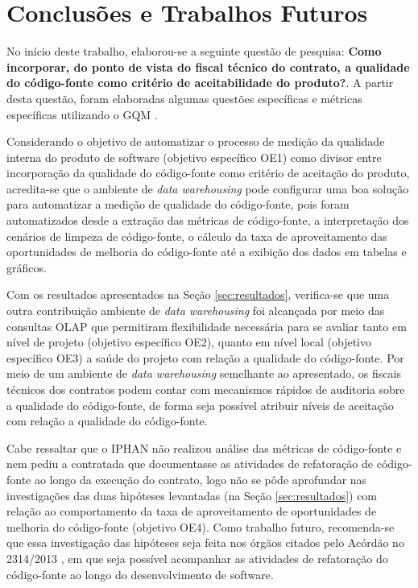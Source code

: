 \section{Conclusões e Trabalhos Futuros}

No início deste trabalho, elaborou-se a seguinte questão de pesquisa: \textbf{Como incorporar, do ponto de vista do fiscal técnico do contrato, a qualidade do código-fonte como critério de aceitabilidade do produto?}. A partir desta questão, foram elaboradas algumas questões específicas e métricas específicas utilizando o GQM \cite{Basili96b}.

Considerando o objetivo de automatizar o processo de medição da qualidade interna do produto de software (objetivo específico OE1) como divisor entre incorporação da qualidade do código-fonte como critério de aceitação do produto, acredita-se que o ambiente de \textit{data warehousing} pode configurar uma boa solução para automatizar a medição de qualidade do código-fonte, pois foram automatizados desde a extração das métricas de código-fonte, a interpretação dos cenários de limpeza de código-fonte, o cálculo da taxa de aproveitamento das oportunidades de melhoria do código-fonte até a exibição dos dados em tabelas e gráficos.

Com os resultados apresentados na Seção \ref{sec:resultados}, verifica-se que uma outra contribuição ambiente de \textit{data warehousing} foi alcançada por meio das consultas OLAP que permitiram flexibilidade necessária para se avaliar tanto em nível de projeto (objetivo específico OE2), quanto em nível local (objetivo específico OE3) a saúde do projeto com relação a qualidade do código-fonte. Por meio de um ambiente de \textit{data warehousing} semelhante ao apresentado, os fiscais técnicos dos contratos podem contar com mecanismos rápidos de auditoria sobre a qualidade do código-fonte, de forma seja possível atribuir níveis de aceitação com relação a qualidade do código-fonte. 

Cabe ressaltar que o IPHAN não realizou análise das métricas de código-fonte e nem pediu a contratada que documentasse as atividades de refatoração de código-fonte ao longo da execução do contrato, logo não se pôde aprofundar nas investigações das duas hipóteses levantadas (na Seção \ref{sec:resultados}) com relação ao comportamento da taxa de aproveitamento de oportunidades de melhoria do código-fonte (objetivo OE4). Como trabalho futuro, recomenda-se que essa investigação das hipóteses seja feita nos órgãos citados pelo Acórdão no 2314/2013 \cite{TCU:2013}, em que seja possível acompanhar as atividades de refatoração do código-fonte ao longo do desenvolvimento de software.

